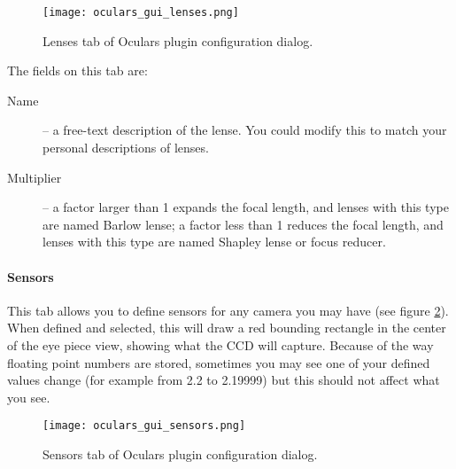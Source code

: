 \begin{figure}[ht]\centering
\texttt{[image: oculars\_gui\_lenses.png]}
\caption{Lenses tab of Oculars plugin configuration dialog.}
\label{fig:plugins:Oculars:Gui:Lenses}
\end{figure}

The fields on this tab are:
\begin{description}
\item[Name] -- a free-text description of the lense. You could modify this to match your personal descriptions of lenses.
\item[Multiplier] -- a factor larger than 1 expands the focal length, and lenses with this type are named Barlow lense; 
                     a factor less   than 1 reduces the focal length, and lenses with this type are named Shapley lense or focus reducer.
\end{description}

\paragraph{Sensors}

This tab allows you to define sensors for any camera you may have (see figure \ref{fig:plugins:Oculars:Gui:Sensors}). 
When defined and selected, this will draw a red bounding rectangle in the center of the eye piece view, showing what the CCD will capture. 
Because of the way floating point numbers are stored, sometimes you may see one of your defined values change (for example from 2.2 to 2.19999) but this should not affect what you see.

\begin{figure}[ht]\centering
\texttt{[image: oculars\_gui\_sensors.png]}
\caption{Sensors tab of Oculars plugin configuration dialog.}
\label{fig:plugins:Oculars:Gui:Sensors}
\end{figure}

